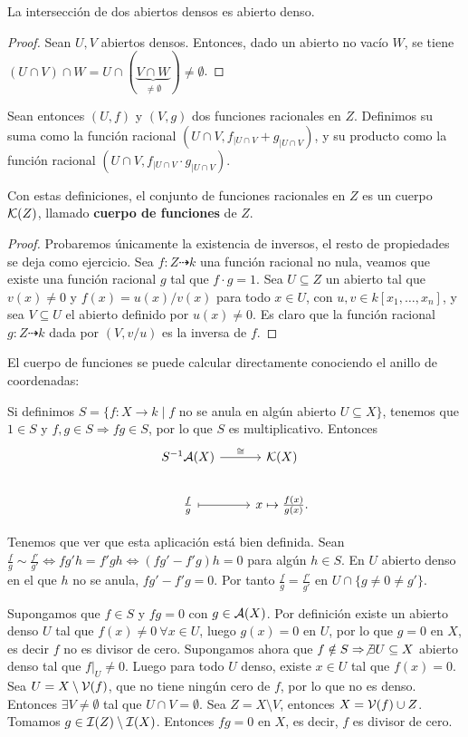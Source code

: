 \documentclass[ACGA.tex]{subfiles}
\begin{document}
\begin{prop}
La intersección de dos abiertos densos es abierto denso.
\end{prop}
\begin{proof}
Sean $U,V$ abiertos densos. Entonces, dado un abierto no vacío $W$, se tiene $(U\cap V)\cap W=U\cap(\underbrace{V\cap W}_{\neq\emptyset})\neq\emptyset$.
\end{proof}
Sean entonces $(U,f)$ y $(V,g)$ dos funciones racionales en $Z$. Definimos su suma como la función racional $(U\cap V,f_{|U\cap V}+g_{|U\cap V})$, y su producto como la función racional $(U\cap V,f_{|U\cap V}\cdot g_{|U\cap V})$.

\begin{prop}
 Con estas definiciones, el conjunto de funciones racionales en $Z$ es un cuerpo ${\mathcal K}(Z)$, llamado {\bf cuerpo de funciones} de $Z$.
\end{prop}

\begin{proof}
 Probaremos únicamente la existencia de inversos, el resto de propiedades se deja como ejercicio. Sea $f:Z\dashrightarrow k$ una función racional no nula, veamos que existe una función racional $g$ tal que $f\cdot g=1$. Sea $U\subseteq Z$ un abierto tal que $v(x)\neq 0$ y $f(x)=u(x)/v(x)$ para todo $x\in U$, con $u,v\in k[x_1,\ldots,x_n]$, y sea $V\subseteq U$ el abierto definido por $u(x)\neq 0$. Es claro que la función racional $g:Z\dashrightarrow k$ dada por $(V,v/u)$ es la inversa de $f$.  
\end{proof}


El cuerpo de funciones se puede calcular directamente conociendo el anillo de coordenadas:

Si definimos $S=\{f:X\to k\mid f$ no se anula en algún abierto $U\subseteq X\}$, tenemos que $1\in S$ y $f,g\in S\Rightarrow fg\in S$, por lo que $S$ es multiplicativo. Entonces 
\[
\begin{tikzcd}
S^{-1}\calA(X)\arrow[r,"\cong"] & \KK(X)\\
\frac{f}{g}\arrow[r,mapsto] & x\mapsto\frac{f(x)}{g(x)}.
\end{tikzcd}
\]

Tenemos que ver que esta aplicación está bien definida. Sean $\frac{f}{g}\sim\frac{f'}{g'}\Leftrightarrow fg'h=f'gh\Leftrightarrow (fg'-f'g)h=0$ para algún $h\in S$. En $U$ abierto denso en el que $h$ no se anula, $fg'-f'g=0$. Por tanto $\frac{f}{g}=\frac{f'}{g'}$ en $U\cap\{g\neq 0\neq g'\}$. 

Supongamos que $f\in S$ y $fg=0$ con $g\in\mathcal{A}(X)$. Por definición existe un abierto denso $U$ tal que $f(x)\neq 0\ \forall x\in U$, luego $g(x)=0$ en $U$, por lo que $g=0$ en $X$, es decir $f$ no es divisor de cero. Supongamos ahora que $f\notin S\Rightarrow\not\exists U\subseteq X$ abierto denso tal que $f|_U\neq 0$. Luego para todo $U$ denso, existe $x\in U$ tal que $f(x)=0$. Sea $U=X\setminus\mathcal{V}(f)$, que no tiene ningún cero de $f$, por lo que no es denso. Entonces $\exists V\neq\emptyset$ tal que $U\cap V=\emptyset$. Sea $Z=X\setminus V$, entonces $X=\mathcal{V}(f)\cup Z$. Tomamos $g\in\mathcal{I}(Z)\setminus\mathcal{I}(X)$. Entonces $fg=0$ en $X$, es decir, $f$ es divisor de cero.
\end{document}
